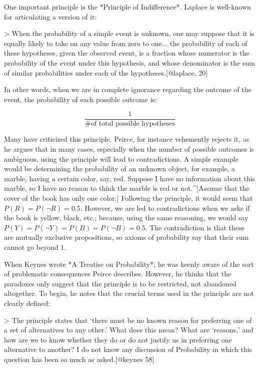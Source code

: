 One important principle is the *Principle of Indifference*. Laplace is
well-known for articulating a version of it:

\textgreater{} When the probability of a simple event is unknown, one
may suppose that it is equally likely to take on any value from zero to
one... the probability of each of these hypotheses, given the observed
event, is a fraction whose numerator is the probability of the event
under this hypothesis, and whose denominator is the sum of similar
probabilities under each of the hypotheses.{[}@laplace, 20{]}

In other words, when we are in complete ignorance regarding the outcome
of the event, the probability of each possible outcome is:

\[\frac{\text{1}}{\text{\# of total possible hypotheses}}\]

Many have criticized this principle. Peirce, for instance vehemently
rejects it, as he argues that in many cases, especially when the number
of possible outcomes is ambiguous, using the principle will lead to
contradictions. A simple example would be determining the probability of
an unknown object, for example, a marble, having a certain color, say,
red. Suppose I have no information about this marble, so I have no
reason to think the marble is red or not.\^{}{[}Assume that the cover of
the book has only one color.{]} Following the principle, it would seem
that \(P(R) = P(\neg R) = 0.5\). However, we are led to contradictions
when we asks if the book is yellow, black, etc.; because, using the same
reasoning, we would say \(P(Y) = P(\neg Y) = P(B) = P(\neg B) = 0.5\).
The contradiction is that these are mutually exclusive propositions, so
axioms of probability say that their sum cannot go beyond \(1\).

When Keynes wrote *A Treatise on Probability*, he was keenly aware of
the sort of problematic consequences Peirce describes. However, he
thinks that the paradoxes only suggest that the principle is to be
restricted, not abandoned altogether. To begin, he notes that the
crucial terms used in the principle are not clearly defined:

\textgreater{} The principle states that `there must be no known reason
for preferring one of a set of alternatives to any other.' What does
this mean? What are `reasons,' and how are we to know whether they do or
do not justify us in preferring one alternative to another? I do not
know any discussion of Probability in which this question has been so
much as asked.{[}@keynes 58{]}

